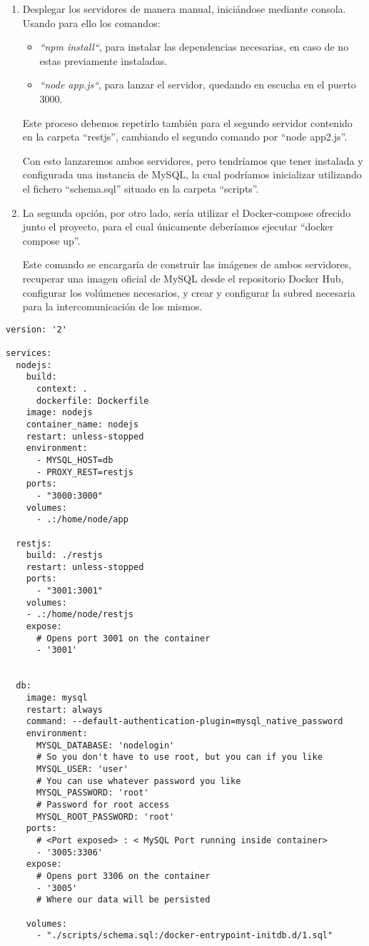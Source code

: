   \begin{enumerate}
    \item Desplegar los servidores de manera manual, iniciándose mediante consola. Usando para ello los comandos:

          \begin{itemize}
            \item \textit{“npm install“}, para instalar las dependencias necesarias, en caso de no estas previamente instaladas.
            \item \textit{“node app.js“}, para lanzar el servidor, quedando en escucha en el puerto 3000.
          \end{itemize}
          Este proceso debemos repetirlo también para el segundo servidor contenido en la carpeta “restjs”, cambiando el segundo comando por “node app2.js”.
    
          Con esto lanzaremos ambos servidores, pero tendríamos que tener instalada y configurada una instancia de MySQL, la cual podríamos inicializar utilizando el fichero “schema.sql” situado en la carpeta “scripts”.
    
     \item La segunda opción, por otro lado, sería utilizar el Docker-compose ofrecido junto el proyecto, para el cual únicamente deberíamos ejecutar “docker compose up”.
     
          Este comando se encargaría de construir las imágenes de ambos servidores, recuperar una imagen oficial de MySQL desde el repositorio Docker Hub, configurar los volúmenes necesarios, y crear y configurar la subred necesaria para la intercomunicación de los mismos.
     

  \end{enumerate}

\begin{lstlisting}
version: '2'

services:
  nodejs:
    build:
      context: .
      dockerfile: Dockerfile
    image: nodejs
    container_name: nodejs
    restart: unless-stopped
    environment:
      - MYSQL_HOST=db
      - PROXY_REST=restjs
    ports:
      - "3000:3000"
    volumes:
      - .:/home/node/app
  
  restjs:
    build: ./restjs
    restart: unless-stopped
    ports:
      - "3001:3001"
    volumes:
    - .:/home/node/restjs 
    expose:
      # Opens port 3001 on the container
      - '3001'  
   

  db:
    image: mysql
    restart: always
    command: --default-authentication-plugin=mysql_native_password
    environment:
      MYSQL_DATABASE: 'nodelogin'
      # So you don't have to use root, but you can if you like
      MYSQL_USER: 'user'
      # You can use whatever password you like
      MYSQL_PASSWORD: 'root'
      # Password for root access
      MYSQL_ROOT_PASSWORD: 'root'
    ports:
      # <Port exposed> : < MySQL Port running inside container>
      - '3005:3306'
    expose:
      # Opens port 3306 on the container
      - '3005'
      # Where our data will be persisted
    
    volumes:
      - "./scripts/schema.sql:/docker-entrypoint-initdb.d/1.sql"

\end{lstlisting}

